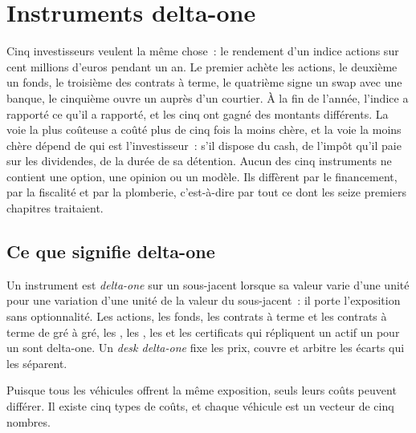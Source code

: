 \chapter{Instruments delta-one}\label{ch:m1:delta-one-instruments}

Cinq investisseurs veulent la même chose~: le rendement d'un indice actions
sur cent millions d'euros pendant un an. Le premier achète les actions, le deuxième un fonds, le
troisième des contrats à terme, le quatrième signe un swap avec une banque, le cinquième ouvre un
 auprès d'un courtier. À la fin de l'année, l'indice a
rapporté ce qu'il a rapporté, et les cinq ont gagné des montants différents.
La voie la plus coûteuse a coûté plus de cinq fois la moins chère, et la voie la moins chère
dépend de qui est l'investisseur~: s'il dispose du cash, de l'impôt qu'il paie
sur les dividendes, de la durée de sa détention. Aucun des cinq instruments
ne contient une option, une opinion ou un modèle. Ils diffèrent par le financement, par la fiscalité et par
la plomberie, c'est-à-dire par tout ce dont les seize premiers chapitres
traitaient.

\section{Ce que signifie delta-one}

\begin{definition}\label{def:m1:delta-one-instruments:deltaone}
Un instrument est \emph{delta-one} sur un sous-jacent lorsque
sa valeur varie d'une unité pour une variation d'une unité de la valeur du
sous-jacent~: il porte l'exposition sans optionnalité. Les actions, les fonds,
les contrats à terme et les contrats à terme de gré à gré, les , les ,
les  et les certificats qui répliquent un actif un pour un sont
delta-one. Un \emph{desk delta-one} fixe les prix, couvre et arbitre les
écarts qui les séparent.
\end{definition}

Puisque tous les véhicules offrent la même exposition, seuls leurs coûts peuvent différer.
Il existe cinq types de coûts, et chaque véhicule est un vecteur de cinq nombres.

